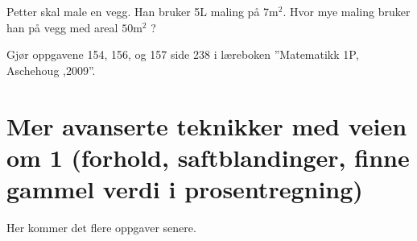 \documentclass[a4, 11pt, twoside]{article}
\theoremstyle{definition}
\begin{document}
\begin{Exercise}
Petter skal male en vegg. Han bruker 5L maling på 7m$^2$. Hvor mye
    maling bruker han på vegg med areal $50\text{m}^2$ ?
\end{Exercise}

\begin{Exercise}
Gjør oppgavene 154, 156, og 157 side 238 i læreboken ''Matematikk 1P, Aschehoug ,2009''.
\end{Exercise}

\section*{Mer avanserte teknikker med veien om 1 (forhold,
saftblandinger, finne gammel verdi i prosentregning)}
Her kommer det flere oppgaver senere.
\end{document}
